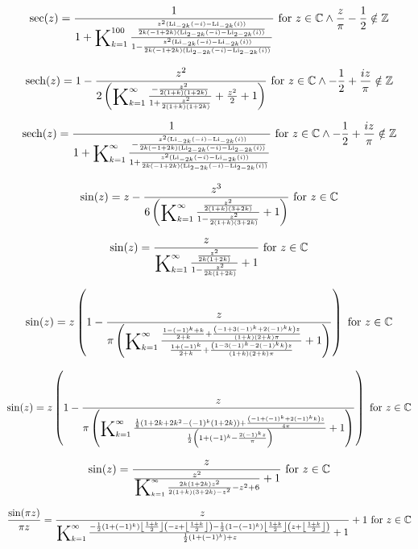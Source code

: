 \documentclass{article}
\newcommand{\bigK}{\mathop{\raisebox{-5pt}{\huge K}}}
\begin{document}
\[\sec (z)=\frac{1}{1+\bigK_{k=1}^{100}\frac{\frac{z^2 (\text{Li}_{-2 k}(-i)-\text{Li}_{-2 k}(i))}{2 k (-1+2 k) (\text{Li}_{2-2 k}(-i)-\text{Li}_{2-2 k}(i))}}{1-\frac{z^2 (\text{Li}_{-2 k}(-i)-\text{Li}_{-2 k}(i))}{2 k (-1+2 k) (\text{Li}_{2-2 k}(-i)-\text{Li}_{2-2 k}(i))}}}\text{ for }z\in \mathbb{C}\land \frac{z}{\pi }-\frac{1}{2}\notin \mathbb{Z}\] 

\[\text{sech}(z)=1-\frac{z^2}{2 \left(\bigK_{k=1}^{\infty}\frac{-\frac{z^2}{2 (1+k) (1+2 k)}}{1+\frac{z^2}{2 (1+k) (1+2 k)}}+\frac{z^2}{2}+1\right)}\text{ for }z\in \mathbb{C}\land -\frac{1}{2}+\frac{i z}{\pi }\notin \mathbb{Z}\] 

\[\text{sech}(z)=\frac{1}{1+\bigK_{k=1}^{\infty}\frac{-\frac{z^2 (\text{Li}_{-2 k}(-i)-\text{Li}_{-2 k}(i))}{2 k (-1+2 k) (\text{Li}_{2-2 k}(-i)-\text{Li}_{2-2 k}(i))}}{1+\frac{z^2 (\text{Li}_{-2 k}(-i)-\text{Li}_{-2 k}(i))}{2 k (-1+2 k) (\text{Li}_{2-2 k}(-i)-\text{Li}_{2-2 k}(i))}}}\text{ for }z\in \mathbb{C}\land -\frac{1}{2}+\frac{i z}{\pi }\notin \mathbb{Z}\] 

\[\sin (z)=z-\frac{z^3}{6 \left(\bigK_{k=1}^{\infty}\frac{\frac{z^2}{2 (1+k) (3+2 k)}}{1-\frac{z^2}{2 (1+k) (3+2 k)}}+1\right)}\text{ for }z\in \mathbb{C}\] 

\[\sin (z)=\frac{z}{\bigK_{k=1}^{\infty}\frac{\frac{z^2}{2 k (1+2 k)}}{1-\frac{z^2}{2 k (1+2 k)}}+1}\text{ for }z\in \mathbb{C}\] 

\[\sin (z)=z \left(1-\frac{z}{\pi  \left(\bigK_{k=1}^{\infty}\frac{\frac{1-(-1)^k+k}{2+k}+\frac{\left(-1+3 (-1)^k+2 (-1)^k k\right) z}{(1+k) (2+k) \pi }}{\frac{1+(-1)^k}{2+k}+\frac{\left(1-3 (-1)^k-2 (-1)^k k\right) z}{(1+k) (2+k) \pi }}+1\right)}\right)\text{ for }z\in \mathbb{C}\] 

\[\sin (z)=z \left(1-\frac{z}{\pi  \left(\bigK_{k=1}^{\infty}\frac{\frac{1}{8} \left(1+2 k+2 k^2-(-1)^k (1+2 k)\right)+\frac{\left(-1+(-1)^k+2 (-1)^k k\right) z}{4 \pi }}{\frac{1}{2} \left(1+(-1)^k-\frac{2 (-1)^k z}{\pi }\right)}+1\right)}\right)\text{ for }z\in \mathbb{C}\] 

\[\sin (z)=\frac{z}{\frac{z^2}{\bigK_{k=1}^{\infty}\frac{2 k (1+2 k) z^2}{2 (1+k) (3+2 k)-z^2}-z^2+6}+1}\text{ for }z\in \mathbb{C}\] 

\[\frac{\sin (\pi  z)}{\pi  z}=\frac{z}{\bigK_{k=1}^{\infty}\frac{-\frac{1}{2} \left(1+(-1)^k\right) \left\lfloor \frac{1+k}{2}\right\rfloor  \left(-z+\left\lfloor \frac{1+k}{2}\right\rfloor \right)-\frac{1}{2} \left(1-(-1)^k\right) \left\lfloor \frac{1+k}{2}\right\rfloor  \left(z+\left\lfloor \frac{1+k}{2}\right\rfloor \right)}{\frac{1}{2} \left(1+(-1)^k\right)+z}+1}+1\text{ for }z\in \mathbb{C}\] 
\end{document}
